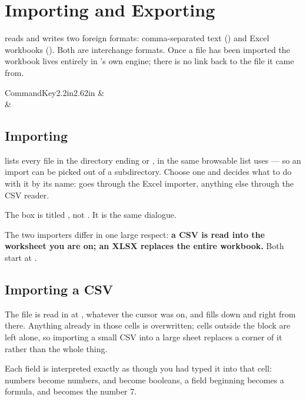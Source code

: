 \chapter{Importing and Exporting}
\label{ch:importexport}

\ccprod{} reads and writes two foreign formats: comma-separated text
() and Excel workbooks (). Both are interchange
formats. Once a file has been imported the workbook lives entirely in
\ccprod's own engine; there is no link back to the file it came from.

\begin{cctable}{Command}{Key}{2.2in}{2.62in}
 &  \\
 &  \\
\end{cctable}

\section{Importing}

 lists every file in the directory ending  or
, in the same browsable list  uses --- so an import
can be picked out of a subdirectory. Choose
one and \ccprod{} decides what to do with it by its name:  goes
through the Excel importer, anything else through the CSV reader.

\begin{ccnote}
The box is titled , not . It is the same dialogue.
\end{ccnote}

The two importers differ in one large respect: \textbf{a CSV is read into the
worksheet you are on; an XLSX replaces the entire workbook.} Both start at
.

\section{Importing a CSV}

The file is read in at , whatever the cursor was on, and fills
down and right from there. Anything already in those cells is overwritten;
cells outside the block are left alone, so importing a small CSV into a large
sheet replaces a corner of it rather than the whole thing.

Each field is interpreted exactly as though you had typed it into that cell:
numbers become numbers,  and  become booleans, a field
beginning \lit{=} becomes a formula, and  becomes the number 7.

